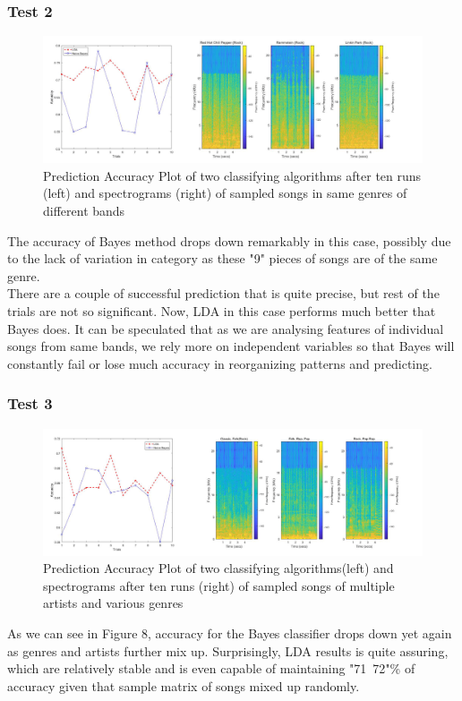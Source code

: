 \documentclass[11pt,a4paper]{article}
\numberwithin{equation}{subsection}
\begin{document}
\subsubsection{Test 2}
\begin{figure}[H]
\begin{center}
\includegraphics[scale=0.20]{t2.jpg}
\caption{Prediction Accuracy Plot of two classifying algorithms after ten runs (left) and spectrograms (right) of sampled songs in same genres of different bands}
\end{center}
\end{figure}
The accuracy of Bayes method drops down remarkably in this case, possibly due to the lack of variation in category as these "9" pieces of songs are of the same genre.\\ There are a couple of successful prediction that is quite precise, but rest of the trials are not so significant. Now, LDA in this case performs much better that Bayes does. It can be speculated that as we are analysing features of individual songs from same bands, we rely more on independent variables so that Bayes will constantly fail or lose much accuracy in reorganizing patterns and predicting.

\subsubsection{Test 3}
\begin{figure}[H]
\begin{center}
\includegraphics[scale=0.20]{t3.jpg}
\caption{Prediction Accuracy Plot of two classifying algorithms(left) and spectrograms after ten runs (right) of sampled songs of multiple artists and various genres}
\end{center}
\end{figure}
As we can see in Figure 8, accuracy for the Bayes classifier drops down yet again as genres and artists further mix up. Surprisingly, LDA results is quite assuring, which are relatively stable and is even capable of maintaining "71~72"\% of accuracy given that sample matrix of songs mixed up randomly.
\end{document}
